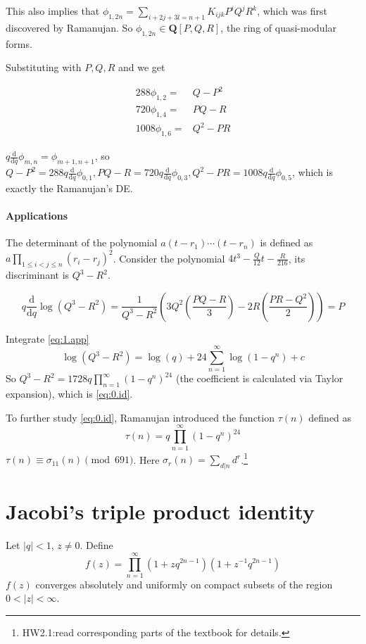 \documentclass{article}
\begin{document}
This also implies that $\phi_{1,2n} = \sum\limits_{i+2j+3l =n+1}^{}K_{ijk}P^iQ^jR^k$, which was first discovered by Ramanujan. So $\phi_{1,2n}\in \bm{Q}[P,Q,R]$, the ring of quasi-modular forms.

Substituting with $P,Q,R$ and we get

\begin{align*}
 288 \phi_{1,2} = & Q - P^2\\
 720\phi_{1,4} = & PQ-R\\
 1008 \phi_{1,6} = & Q^2 - PR
\end{align*}

$q \frac{\mathrm{d}}{\mathrm{d}q}\phi_{m,n} = \phi_{m+1,n+1}$, so $Q-P^2 = 288 q \frac{\mathrm{d}}{\mathrm{d}q}\phi_{0,1}, PQ-R = 720 q \frac{\mathrm{d}}{\mathrm{d}q}\phi_{0,3}, Q^2-PR=1008 q \frac{\mathrm{d}}{\mathrm{d}q}\phi_{0,5}$, which is exactly the Ramanujan's DE.

\paragraph{Applications}
The determinant of the polynomial $a(t-r_1)\cdots (t-r_n)$ is defined as $a\prod\limits_{1\leq i<j\leq n}(r_i-r_j)^2$. Consider the polynomial $4t^3 - \frac{Q}{12}t - \frac{R}{216}$, its discriminant is $Q^3-R^2$.

\begin{equation}
  \label{eq:1.app}
q \frac{\mathrm{d}}{\mathrm{d}q}\log(Q^3-R^2) = \frac{1}{Q^3-R^2} \left( 3Q^2 (\frac{PQ-R}{3}) - 2R (\frac{PR-Q^2}{2}) \right) = P
\end{equation}


Integrate \ref{eq:1.app}
\begin{equation}
\log(Q^3-R^2) = \log(q) + 24 \sum\limits_{n=1}^{\infty} \log(1-q^n) +c
\end{equation}
So $Q^3-R^2 = 1728q \prod\limits_{n=1}^{\infty} (1-q^n)^{24}$ (the coefficient is calculated via Taylor expansion), which is \ref{eq:0.id}.

To further study \ref{eq:0.id}, Ramanujan introduced the function $\tau(n)$ defined as
\begin{equation}
\tau(n)=q\prod_{n=1}^{\infty} (1-q^n)^{24}
\end{equation}
 $\tau(n) \equiv \sigma_{11}(n) \pmod{691}$. Here $\sigma_{r}(n) = \sum\limits_{d|n}^{}d^r$.\footnote{HW2.1:read corresponding parts of the textbook for details.}

\section{Jacobi's triple product identity}
Let $|q|<1$, $z\neq 0$. Define
\begin{equation}
f(z) = \prod_{n=1}^{\infty} (1+zq^{2n-1})(1+z^{-1}q^{2n-1})
\end{equation}
$f(z)$ converges absolutely and uniformly on compact subsets of the region $0<|z|<\infty$.
\end{document}
